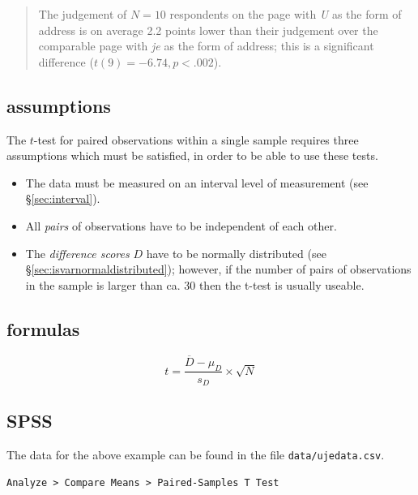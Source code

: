 \documentclass[
]{book}
\begin{document}
\begin{quote}
The judgement of \(N=10\) respondents on the page with \emph{U} as the
form of address is on average 2.2 points lower than their judgement
over the comparable page with \emph{je} as the form of address; this is
a significant difference (\(t(9)=-6.74, p<.002\)).
\end{quote}

\hypertarget{assumptions-1}{%
\subsection{assumptions}\label{assumptions-1}}

The \(t\)-test for paired observations within a single sample requires three
assumptions which must be satisfied, in order to be able to use these
tests.

\begin{itemize}
\item
  The data must be measured on an interval level of measurement (see
  §\ref{sec:interval}).
\item
  All \emph{pairs} of observations have to be independent of
  each other.
\item
  The \emph{difference scores} \(D\) have to be normally distributed (see\\
  §\ref{sec:isvarnormaldistributed}); however, if the number of pairs of
  observations in the sample is larger than ca. 30 then the t-test is
  usually useable.
\end{itemize}

\hypertarget{sec:formulas13-4}{%
\subsection{formulas}\label{sec:formulas13-4}}

\begin{equation}
  \label{eq:t-pairedsamples}
  t = \frac{ \overline{D}-\mu_D} { s_D } \times \sqrt{N}
\end{equation}

\hypertarget{sec:SPSS-ttest-paired}{%
\subsection{SPSS}\label{sec:SPSS-ttest-paired}}

The data for the above example can be found in the file \texttt{data/ujedata.csv}.

\begin{verbatim}
Analyze > Compare Means > Paired-Samples T Test
\end{verbatim}
\end{document}
